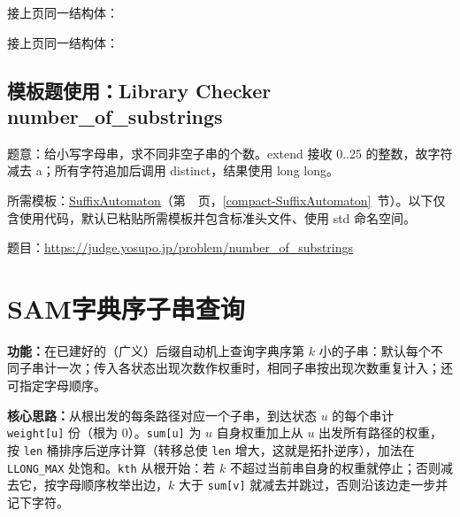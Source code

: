 \Needspace{189pt}



\newpage

\noindent 接上页同一结构体：



\newpage

\noindent 接上页同一结构体：



\Needspace{277pt}

\subsection*{模板题使用：Library Checker number\_of\_substrings}

\label{usage-example-71}

题意：给小写字母串，求不同非空子串的个数。extend 接收 0..25 的整数，故字符减去 a；所有字符追加后调用 distinct，结果使用 long long。

所需模板：\hyperref[compact-SuffixAutomaton]{SuffixAutomaton}（第~\pageref{compact-SuffixAutomaton}~页，\ref{compact-SuffixAutomaton}~节）。以下仅含使用代码，默认已粘贴所需模板并包含标准头文件、使用 std 命名空间。

题目：\url{https://judge.yosupo.jp/problem/number_of_substrings}



\section{SAM字典序子串查询}\label{compact-SAMLex}

\noindent\textbf{功能：}\allowbreak 在已建好的（广义）后缀自动机上查询字典序第 $k$ 小的子串：默认每个不同子串计一次；传入各状态出现次数作权重时，相同子串按出现次数重复计入；还可指定字母顺序。

\textbf{核心思路：}\allowbreak 从根出发的每条路径对应一个子串，到达状态 $u$ 的每个串计 \texttt{weight[u]} 份（根为 0）。\texttt{sum[u]} 为 $u$ 自身权重加上从 $u$ 出发所有路径的权重，按 \texttt{len} 桶排序后逆序计算（转移总使 \texttt{len} 增大，这就是拓扑逆序），加法在 \texttt{LLONG\_MAX} 处饱和。\texttt{kth} 从根开始：若 $k$ 不超过当前串自身的权重就停止；否则减去它，按字母顺序枚举出边，$k$ 大于 \texttt{sum[v]} 就减去并跳过，否则沿该边走一步并记下字符。



